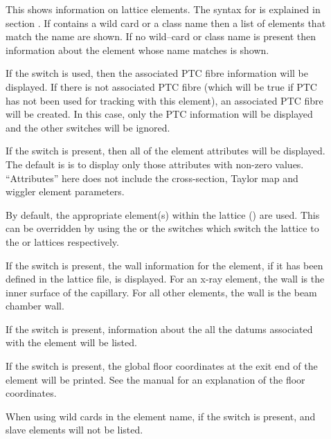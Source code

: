 {{{\begin{description}
\item[\protect\parbox{6in}{
  show element \{-all\_attributes\} \{-base\} \{-data\} \{-design\} \{-everything\} \{-field\} \\
  \hspace*{0.35in} \{-floor_coords\} \{-no_slaves\} \{-ptc\} \{-taylor\} \{-wall\} \{-xfer_mat\} <ele\_name> }] \Newline

\vskip -0.1in

This shows information on lattice elements. The syntax for  
is explained in section . If
 contains a wild card or a class name then a list of
elements that match the name are shown. If no wild--card or class name
is present then information about the element whose name matches
 is shown.

If the  switch is used, then the associated PTC fibre
information will be displayed. If there is not associated PTC fibre
(which will be true if PTC has not been used for tracking with this
element), an associated PTC fibre will be created. In this case, only
the PTC information will be displayed and the other switches will be
ignored.

If the  switch is present, then all of the element attributes
will be displayed. The default is is to display only those attributes
with non-zero values. ``Attributes'' here does not include the cross-section,
Taylor map and wiggler element parameters.

By default, the appropriate element(s) within the  lattice
() are used. This can be overridden by using the
 or the  switches which switch the lattice to
the  or  lattices respectively.

If the  switch is present, the wall information for the
element, if it has been defined in the lattice file, is displayed. For
an x-ray  element, the wall is the inner surface of the
capillary. For all other elements, the wall is the beam chamber wall.

If the  switch is present, information about the 
all the datums associated with the element will be listed. 

If the  switch is present, the global
floor coordinates at the exit end of the element will
be printed. See the \bmad manual for an explanation
of the floor coordinates.

When using wild cards in the element name, if the 
switch is present,  and  slave elements
will not be listed.


\end{description}}}}
